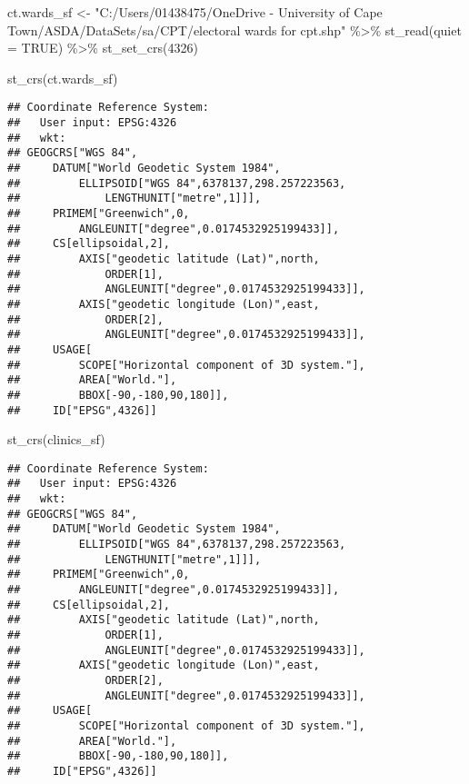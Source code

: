 \documentclass[
]{book}
\newenvironment{Shaded}{\begin{snugshade}}{\end{snugshade}}
\newcommand{\AttributeTok}[1]{\textcolor[rgb]{0.77,0.63,0.00}{#1}}
\newcommand{\ConstantTok}[1]{\textcolor[rgb]{0.00,0.00,0.00}{#1}}
\newcommand{\DecValTok}[1]{\textcolor[rgb]{0.00,0.00,0.81}{#1}}
\newcommand{\FunctionTok}[1]{\textcolor[rgb]{0.00,0.00,0.00}{#1}}
\newcommand{\NormalTok}[1]{#1}
\newcommand{\OtherTok}[1]{\textcolor[rgb]{0.56,0.35,0.01}{#1}}
\newcommand{\SpecialCharTok}[1]{\textcolor[rgb]{0.00,0.00,0.00}{#1}}
\newcommand{\StringTok}[1]{\textcolor[rgb]{0.31,0.60,0.02}{#1}}
\begin{document}
\begin{Shaded}
\begin{Highlighting}[]
\NormalTok{ct.wards\_sf }\OtherTok{\textless{}{-}} \StringTok{"C:/Users/01438475/OneDrive {-} University of Cape Town/ASDA/DataSets/sa/CPT/electoral wards for cpt.shp"} \SpecialCharTok{\%\textgreater{}\%}
  \FunctionTok{st\_read}\NormalTok{(}\AttributeTok{quiet =} \ConstantTok{TRUE}\NormalTok{) }\SpecialCharTok{\%\textgreater{}\%} 
  \FunctionTok{st\_set\_crs}\NormalTok{(}\DecValTok{4326}\NormalTok{)}

\FunctionTok{st\_crs}\NormalTok{(ct.wards\_sf)}
\end{Highlighting}
\end{Shaded}

\begin{verbatim}
## Coordinate Reference System:
##   User input: EPSG:4326 
##   wkt:
## GEOGCRS["WGS 84",
##     DATUM["World Geodetic System 1984",
##         ELLIPSOID["WGS 84",6378137,298.257223563,
##             LENGTHUNIT["metre",1]]],
##     PRIMEM["Greenwich",0,
##         ANGLEUNIT["degree",0.0174532925199433]],
##     CS[ellipsoidal,2],
##         AXIS["geodetic latitude (Lat)",north,
##             ORDER[1],
##             ANGLEUNIT["degree",0.0174532925199433]],
##         AXIS["geodetic longitude (Lon)",east,
##             ORDER[2],
##             ANGLEUNIT["degree",0.0174532925199433]],
##     USAGE[
##         SCOPE["Horizontal component of 3D system."],
##         AREA["World."],
##         BBOX[-90,-180,90,180]],
##     ID["EPSG",4326]]
\end{verbatim}

\begin{Shaded}
\begin{Highlighting}[]
\FunctionTok{st\_crs}\NormalTok{(clinics\_sf)}
\end{Highlighting}
\end{Shaded}

\begin{verbatim}
## Coordinate Reference System:
##   User input: EPSG:4326 
##   wkt:
## GEOGCRS["WGS 84",
##     DATUM["World Geodetic System 1984",
##         ELLIPSOID["WGS 84",6378137,298.257223563,
##             LENGTHUNIT["metre",1]]],
##     PRIMEM["Greenwich",0,
##         ANGLEUNIT["degree",0.0174532925199433]],
##     CS[ellipsoidal,2],
##         AXIS["geodetic latitude (Lat)",north,
##             ORDER[1],
##             ANGLEUNIT["degree",0.0174532925199433]],
##         AXIS["geodetic longitude (Lon)",east,
##             ORDER[2],
##             ANGLEUNIT["degree",0.0174532925199433]],
##     USAGE[
##         SCOPE["Horizontal component of 3D system."],
##         AREA["World."],
##         BBOX[-90,-180,90,180]],
##     ID["EPSG",4326]]
\end{verbatim}
\end{document}
